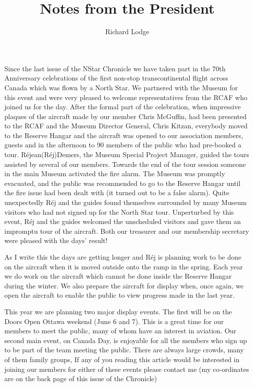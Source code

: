 
%


\title{Notes from the President}
\author{Richard Lodge}

\maketitle

Since the last issue of the NStar Chronicle we have taken part in the
70th Anniversary celebrations of the first non-stop transcontinental
flight across Canada which was flown by a North Star. We partnered with
the Museum for this event and were very pleased to welcome
representatives from the RCAF who joined us for the day. After the
formal part of the celebration, when impressive plaques of the aircraft
made by our member Chris McGuffin, had been presented to the RCAF and
the Museum Director General, Chris Kitzan, everybody moved to the
Reserve Hangar and the aircraft was opened to our association members,
guests and in the afternoon to 90 members of the public who had
pre-booked a tour. R\'{e}jean(R\'{e}j)Demers, the Museum Special Project
Manager, guided the tours assisted by several of our members. Towards
the end of the tour session someone in the main Museum activated the
fire alarm. The Museum was promptly evacuated, and the public was
recommended to go to the Reserve  Hangar until the fire issue had been
dealt with (it turned out to be a false alarm). Quite unexpectedly R\'{e}j
and the guides found themselves surrounded by many Museum visitors who
had not signed up for the North Star tour. Unperturbed by this event,
Réj and the guides welcomed the unscheduled visitors and gave them an
impromptu tour of the aircraft. Both our treasurer and our membership
secretary were pleased with the days' result!

As I write this the days are getting longer and R\'{e}j is planning work to
be done on the aircraft when it is moved outside onto the ramp in the
spring. Each year we do work on the aircraft which cannot be done
inside the Reserve Hangar during the winter. We also prepare the
aircraft for display when, once again, we open the aircraft to enable
the public to view progress made in the last year.

This year we are planning two major display events. The first will be
on the Doors Open Ottawa weekend (June 6 and 7). This is a great time
for our members to meet the public, many of whom have an interest in
aviation. Our second main event, on Canada Day, is enjoyable for all
the members who sign up to be part of the team meeting the public.
There are always large crowds, many of them family groups, If any of
you reading this article would be interested in joining our members for
either of these events please contact me (my co-ordinates are on the
back page of this issue of the Chronicle)

